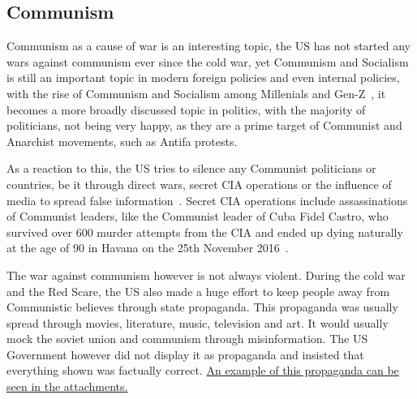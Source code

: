\subsection{Communism}
Communism as a cause of war is an interesting topic, the US has not started any wars against communism ever since the cold war, yet Communism and Socialism is still an important topic in modern foreign policies and even internal policies, with the rise of Communism and Socialism among Millenials and Gen-Z~\cite{theguardian-genz-capitalism}, it becomes a more broadly discussed topic in politics, with the majority of politicians, not being very happy, as they are a prime target of Communist and Anarchist movements, such as Antifa protests.

As a reaction to this, the US tries to silence any Communist politicians or countries, be it through direct wars, secret CIA operations or the influence of media to spread false information~\cite{theguardian-anti-communist-usa}. Secret CIA operations include assassinations of Communist leaders, like the Communist leader of Cuba Fidel Castro, who survived over 600 murder attempts from the CIA and ended up dying naturally at the age of 90 in Havana on the 25th November 2016~\cite{cnn-fidel-castro-assassination}.

The war against communism however is not always violent. During the cold war and the Red Scare, the US also made a huge effort to keep people away from Communistic believes through state propaganda.
This propaganda was usually spread through movies, literature, music, television and art. It would usually mock the soviet union and communism through misinformation. The US Government however did not display it as propaganda and insisted that everything shown was factually correct.
\hyperlink{section.4}{An example of this propaganda can be seen in the attachments.}